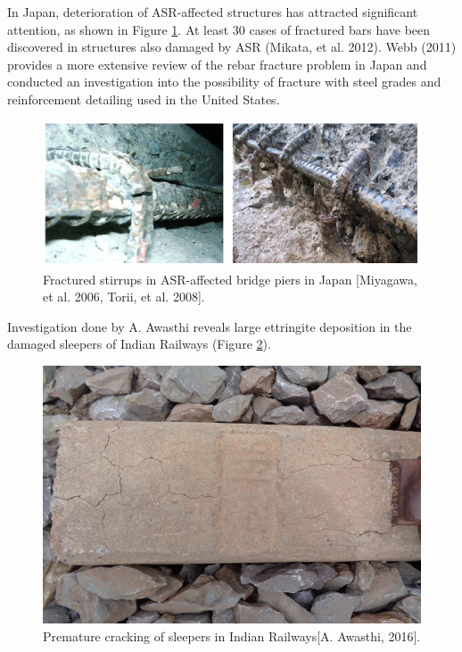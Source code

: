 
In Japan, deterioration of ASR-affected structures  has attracted significant attention, as shown in Figure \ref{fig:Miyagawa}. At least 30 cases of fractured bars have been discovered in structures also damaged by ASR (Mikata, et al. 2012)\cite{Mikata}. Webb (2011) \cite{Webb} provides a more extensive review of the rebar fracture problem in Japan and conducted an investigation into the possibility of fracture with steel grades and reinforcement detailing used in the United States.

    \begin{figure}[ht!]
        \centering
        \includegraphics[width=.9\linewidth]{Files/Background/Miyagawa.png}
        \caption{Fractured stirrups in ASR-affected bridge piers in Japan [Miyagawa, et al. 2006\cite{Miyagawa}, Torii, et al. 2008\cite{Torii}].}
        \label{fig:Miyagawa}
    \end{figure}



Investigation done by A. Awasthi\cite{Awasthi} reveals large ettringite deposition in the damaged sleepers of Indian Railways (Figure \ref{fig:Awasthi_1}).

    \begin{figure}[ht!]
        \centering
        \includegraphics[width=.6\linewidth]{Files/Background/Anupam_1.png}
        \caption{Premature cracking of sleepers in Indian Railways[A. Awasthi, 2016\cite{Awasthi}].}
        \label{fig:Awasthi_1}
    \end{figure}

